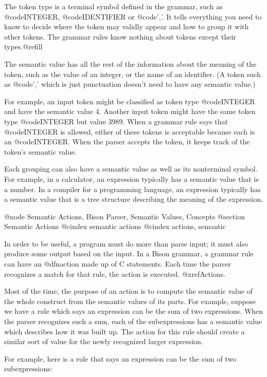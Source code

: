 The token type is a terminal symbol defined in the grammar, such as
@code{INTEGER}, @code{IDENTIFIER} or @code{','}.  It tells everything
you need to know to decide where the token may validly appear and how to
group it with other tokens.  The grammar rules know nothing about tokens
except their types.@refill

The semantic value has all the rest of the information about the
meaning of the token, such as the value of an integer, or the name of an
identifier.  (A token such as @code{','} which is just punctuation doesn't
need to have any semantic value.)

For example, an input token might be classified as token type
@code{INTEGER} and have the semantic value 4.  Another input token might
have the same token type @code{INTEGER} but value 3989.  When a grammar
rule says that @code{INTEGER} is allowed, either of these tokens is
acceptable because each is an @code{INTEGER}.  When the parser accepts the
token, it keeps track of the token's semantic value.

Each grouping can also have a semantic value as well as its nonterminal
symbol.  For example, in a calculator, an expression typically has a
semantic value that is a number.  In a compiler for a programming
language, an expression typically has a semantic value that is a tree
structure describing the meaning of the expression.

@node Semantic Actions, Bison Parser, Semantic Values, Concepts
@section Semantic Actions
@cindex semantic actions
@cindex actions, semantic

In order to be useful, a program must do more than parse input; it must
also produce some output based on the input.  In a Bison grammar, a grammar
rule can have an @dfn{action} made up of C statements.  Each time the
parser recognizes a match for that rule, the action is executed.
@xref{Actions}.
        
Most of the time, the purpose of an action is to compute the semantic value
of the whole construct from the semantic values of its parts.  For example,
suppose we have a rule which says an expression can be the sum of two
expressions.  When the parser recognizes such a sum, each of the
subexpressions has a semantic value which describes how it was built up.
The action for this rule should create a similar sort of value for the
newly recognized larger expression.

For example, here is a rule that says an expression can be the sum of
two subexpressions:

